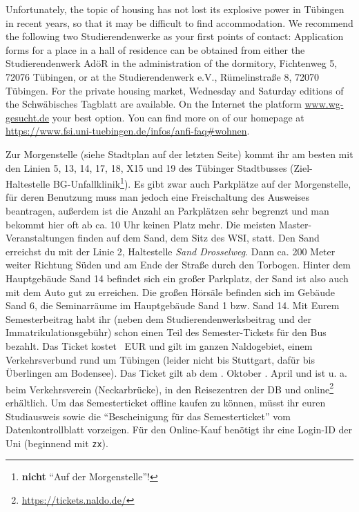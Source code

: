 Unfortunately, the topic of housing has not lost its explosive power in Tübingen in recent years,
so that it may be difficult to find accommodation. We recommend the following two Studierendenwerke as your first points of contact:
Application forms for a place in a hall of residence can be obtained from either the Studierendenwerk AdöR in the administration of the dormitory,
Fichtenweg 5, 72076 Tübingen, or at the Studierendenwerk e.V., Rümelinstraße 8, 72070 Tübingen. For the private housing market, Wednesday and Saturday
editions of the Schwäbisches Tagblatt are available.
On the Internet the platform \url{www.wg-gesucht.de} your best option.
You can find more on of our homepage at \url{https://www.fsi.uni-tuebingen.de/infos/anfi-faq\#wohnen}.
\else

Zur Morgenstelle (siehe Stadtplan auf der letzten Seite) kommt ihr am besten mit den Linien 5, 13, 14, 17, 18, X15 und 19 des Tübinger
Stadtbusses (Ziel-Haltestelle BG-Unfallklinik\footnote{\textbf{nicht} "`Auf der Morgenstelle"'!}). Es gibt zwar auch Parkplätze auf der Morgenstelle,
für deren Benutzung muss man jedoch eine Freischaltung des Ausweises beantragen, außerdem ist die Anzahl an Parkplätzen sehr begrenzt und man bekommt hier oft ab ca. 10 Uhr keinen Platz mehr.
\ifmaster
Die meisten Master-Veranstaltungen finden auf dem Sand, dem Sitz des WSI, statt. Den Sand erreichst du mit der Linie 2, Haltestelle \emph{Sand Drosselweg}. Dann ca. 200 Meter weiter Richtung Süden und am Ende der Straße durch den Torbogen. Hinter dem Hauptgebäude Sand 14 befindet sich ein großer Parkplatz, der Sand ist also auch mit dem Auto gut zu erreichen. Die großen Hörsäle befinden sich im Gebäude Sand 6, die Seminarräume im Hauptgebäude Sand 1 bzw. Sand 14.
\fi
Mit Eurem Semesterbeitrag habt ihr (neben dem Studierendenwerksbeitrag und der Immatrikulationsgebühr) schon einen Teil des Semester-Tickets für den Bus bezahlt.
Das Ticket kostet \ticketpreis~EUR und gilt im ganzen Naldogebiet, einem Verkehrsverbund rund um
Tübingen (leider nicht bis Stuttgart, dafür bis Überlingen am Bodensee). Das Ticket gilt ab dem 
. Oktober
\fi
{}. April
\fi 
 und ist u. a. beim Verkehrsverein (Neckarbrücke), in den Reisezentren der DB und online\footnote{\url{https://tickets.naldo.de/}} erhältlich. Um das Semesterticket offline kaufen zu können, müsst ihr euren Studiausweis sowie die "`Bescheinigung für das Semesterticket"' vom Datenkontrollblatt vorzeigen. Für den Online-Kauf benötigt ihr eine Login-ID der Uni (beginnend mit \texttt{zx}).\\
